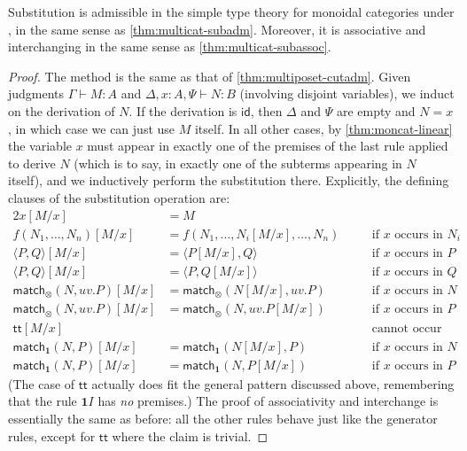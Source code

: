 \documentclass{book}
\def\idfunc{\mathsf{id}}
\let\types\vdash
\def\ttt{\mathsf{tt}}
\def\pair#1#2{\langle #1,#2\rangle}
\def\match{\mathsf{match}}
\def\one{\mathbf{1}}
\let\tensor\otimes
\begin{document}
\begin{lem}\label{thm:moncat-subadm}
  Substitution is admissible in the simple type theory for monoidal categories under \cG, in the same sense as \cref{thm:multicat-subadm}.
  Moreover, it is associative and interchanging in the same sense as \cref{thm:multicat-subassoc}.
\end{lem}
\begin{proof}
  The method is the same as that of \cref{thm:multiposet-cutadm}.
  Given judgments $\Gamma\types M:A$ and $\Delta,x:A,\Psi \types N:B$ (involving disjoint variables), we induct on the derivation of $N$.
  If the derivation is $\idfunc$, then $\Delta$ and $\Psi$ are empty and $N=x$, in which case we can just use $M$ itself.
  In all other cases, by \cref{thm:moncat-linear} the variable $x$ must appear in exactly one of the premises of the last rule applied to derive $N$ (which is to say, in exactly one of the subterms appearing in $N$ itself), and we inductively perform the substitution there.
  Explicitly, the defining clauses of the substitution operation are:
  \begin{alignat*}{2}
    x[M/x] &= M\\
    f(N_1,\dots,N_n)[M/x] &= f(N_1,\dots,N_i[M/x],\dots,N_n) &&\quad\text{if $x$ occurs in $N_i$}\\
    \pair P Q[M/x] &= \pair{P[M/x]}{Q} &&\quad\text{if $x$ occurs in $P$}\\
    \pair P Q[M/x] &= \pair{P}{Q[M/x]} &&\quad\text{if $x$ occurs in $Q$}\\
    \match_\tensor(N,uv.P)[M/x] &= \match_\tensor(N[M/x],uv.P) &&\quad\text{if $x$ occurs in $N$}\\
    \match_\tensor(N,uv.P)[M/x] &= \match_\tensor(N,uv.P[M/x]) &&\quad\text{if $x$ occurs in $P$}\\
    \ttt[M/x] &&&\quad\text{cannot occur}\\
    \match_\one(N,P)[M/x] &= \match_\one(N[M/x],P) &&\quad\text{if $x$ occurs in $N$}\\
    \match_\one(N,P)[M/x] &= \match_\one(N,P[M/x]) &&\quad\text{if $x$ occurs in $P$}
  \end{alignat*}
  (The case of $\ttt$ actually does fit the general pattern discussed above, remembering that the rule $\one I$ has \emph{no} premises.)
  The proof of associativity and interchange is essentially the same as before: all the other rules behave just like the generator rules, except for $\ttt$ where the claim is trivial.
\end{proof}
\end{document}
